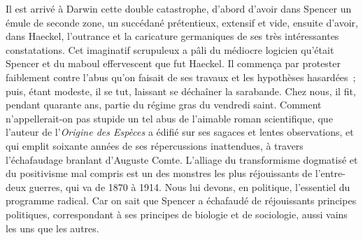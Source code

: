 \documentclass[french,twoside]{book} %
\begin{document}
Il est arrivé à Darwin cette double catastrophe, d’abord d’avoir dans Spencer un émule de seconde zone, un succédané prétentieux, extensif et vide, ensuite d’avoir, dans Haeckel, l’outrance et la caricature germaniques de ses très intéressantes constatations. Cet imaginatif scrupuleux a pâli du médiocre logicien qu’était Spencer et du maboul effervescent que fut Haeckel. Il commença par protester faiblement contre l’abus qu’on faisait de ses travaux et les hypothèses hasardées ; puis, étant modeste, il se tut, laissant se déchaîner la sarabande. Chez nous, il fit, pendant quarante ans, partie du régime gras du vendredi saint. Comment n’appellerait-on pas stupide un tel abus de l’aimable roman scientifique, que l’auteur de l’{\itshape Origine des Espèces} a édifié sur ses sagaces et lentes observations, et qui emplit soixante années de ses répercussions inattendues, à travers l’échafaudage branlant d’Auguste Comte. L’alliage du transformisme dogmatisé et du positivisme mal compris est un des monstres les plus réjouissants de l’entre-deux guerres, qui va de 1870 à 1914. Nous lui devons, en politique, l’essentiel du programme radical. Car on sait que Spencer a échafaudé de réjouissants principes politiques, correspondant à ses principes de biologie et de sociologie, aussi vains les uns que les autres.\par
\end{document}

